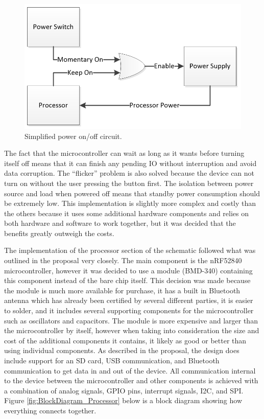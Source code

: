 \begin{figure}[!htb]
\centering
\includegraphics[width=\textwidth]{images/BlockDiagram_OnOff.png}
\caption{Simplified power on/off circuit.}
\label{fig:BlockDiagram_OnOff}
\end{figure}

The fact that the microcontroller can wait as long as it wants before turning 
itself off means that it can finish any pending IO without interruption and 
avoid data corruption. The “flicker” problem is also solved because the device 
can not turn on without the user pressing the button first. The isolation 
between power source and load when powered off means that standby power 
consumption should be extremely low. This implementation is slightly more 
complex and costly than the others because it uses some additional hardware 
components and relies on both hardware and software to work together, but it 
was decided that the benefits greatly outweigh the costs.

The implementation of the processor section of the schematic followed what was 
outlined in the proposal very closely. The main component is the nRF52840 
microcontroller, however it was decided to use a module (BMD-340) containing 
this component instead of the bare chip itself. This decision was made because 
the module is much more available for purchase, it has a built in Bluetooth 
antenna which has already been certified by several different parties, it is 
easier to solder, and it includes several supporting components for the 
microcontroller such as oscillators and capacitors. The module is more 
expensive and larger than the microcontroller by itself, however when taking 
into consideration the size and cost of the additional components it contains, 
it likely as good or better than using individual components. As described in 
the proposal, the design does include support for an SD card, USB communication, 
and Bluetooth communication to get data in and out of the device. All 
communication internal to the device between the microcontroller and other 
components is achieved with a combination of analog signals, GPIO pins, 
interrupt signals, I2C, and SPI. Figure \ref{fig:BlockDiagram_Processor} below 
is a block diagram showing how everything connects together.

